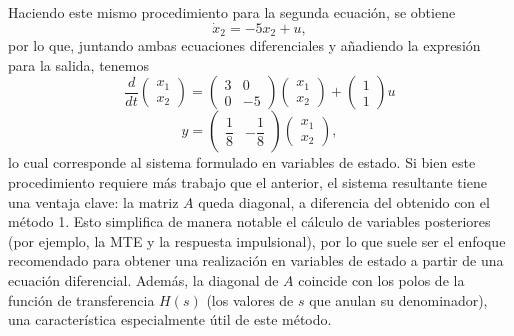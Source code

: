 \documentclass[
  11pt,
  letterpaper,
   addpoints,
   answers
  ]{exam}
\begin{document}
\begin{questions}
\begin{solution}
\begin{equation}
\end{equation}
Haciendo este mismo procedimiento para la segunda ecuación, se obtiene
\begin{equation}
\dot{x}_2 = -5x_2 + u,
\end{equation}
por lo que, juntando ambas ecuaciones diferenciales y añadiendo la expresión para la salida, tenemos
\begin{equation}
\frac{d}{dt}\begin{pmatrix} x_1 \\ x_2 \end{pmatrix}
=
\begin{pmatrix} 3 & 0 \\[2pt] 0 & -5 \end{pmatrix}
\begin{pmatrix} x_1 \\ x_2 \end{pmatrix}
+
\begin{pmatrix} 1 \\ 1 \end{pmatrix} u
\end{equation}
\begin{equation}
y = \begin{pmatrix} \dfrac{1}{8} & -\dfrac{1}{8} \end{pmatrix}
\begin{pmatrix} x_1 \\ x_2 \end{pmatrix},
\end{equation}
lo cual corresponde al sistema formulado en variables de estado. Si bien este procedimiento requiere más trabajo que el anterior, el sistema resultante tiene una ventaja clave: la matriz $A$ queda diagonal, a diferencia del obtenido con el método 1. Esto simplifica de manera notable el cálculo de variables posteriores (por ejemplo, la MTE y la respuesta impulsional), por lo que suele ser el enfoque recomendado para obtener una realización en variables de estado a partir de una ecuación diferencial. Además, la diagonal de $A$ coincide con los polos de la función de transferencia $H(s)$ (los valores de $s$ que anulan su denominador), una característica especialmente útil de este método.

\end{solution}
\end{questions}
\end{document}
